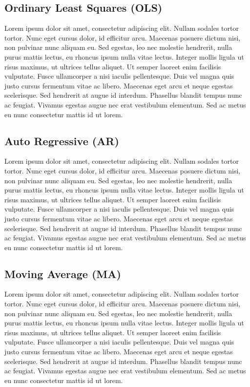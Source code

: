\subsection{Ordinary Least Squares (OLS)}
Lorem ipsum dolor sit amet, consectetur adipiscing elit. Nullam sodales tortor tortor. Nunc eget cursus dolor, id efficitur arcu. Maecenas posuere dictum nisi, non pulvinar nunc aliquam eu. Sed egestas, leo nec molestie hendrerit, nulla purus mattis lectus, eu rhoncus ipsum nulla vitae lectus. Integer mollis ligula ut risus maximus, ut ultrices tellus aliquet. Ut semper laoreet enim facilisis vulputate. Fusce ullamcorper a nisi iaculis pellentesque. Duis vel magna quis justo cursus fermentum vitae ac libero. Maecenas eget arcu et neque egestas scelerisque. Sed hendrerit at augue id interdum. Phasellus blandit tempus nunc ac feugiat. Vivamus egestas augue nec erat vestibulum elementum. Sed ac metus eu nunc consectetur mattis id ut lorem.

\subsection{Auto Regressive (AR)}
Lorem ipsum dolor sit amet, consectetur adipiscing elit. Nullam sodales tortor tortor. Nunc eget cursus dolor, id efficitur arcu. Maecenas posuere dictum nisi, non pulvinar nunc aliquam eu. Sed egestas, leo nec molestie hendrerit, nulla purus mattis lectus, eu rhoncus ipsum nulla vitae lectus. Integer mollis ligula ut risus maximus, ut ultrices tellus aliquet. Ut semper laoreet enim facilisis vulputate. Fusce ullamcorper a nisi iaculis pellentesque. Duis vel magna quis justo cursus fermentum vitae ac libero. Maecenas eget arcu et neque egestas scelerisque. Sed hendrerit at augue id interdum. Phasellus blandit tempus nunc ac feugiat. Vivamus egestas augue nec erat vestibulum elementum. Sed ac metus eu nunc consectetur mattis id ut lorem.

\subsection{Moving Average (MA)}
Lorem ipsum dolor sit amet, consectetur adipiscing elit. Nullam sodales tortor tortor. Nunc eget cursus dolor, id efficitur arcu. Maecenas posuere dictum nisi, non pulvinar nunc aliquam eu. Sed egestas, leo nec molestie hendrerit, nulla purus mattis lectus, eu rhoncus ipsum nulla vitae lectus. Integer mollis ligula ut risus maximus, ut ultrices tellus aliquet. Ut semper laoreet enim facilisis vulputate. Fusce ullamcorper a nisi iaculis pellentesque. Duis vel magna quis justo cursus fermentum vitae ac libero. Maecenas eget arcu et neque egestas scelerisque. Sed hendrerit at augue id interdum. Phasellus blandit tempus nunc ac feugiat. Vivamus egestas augue nec erat vestibulum elementum. Sed ac metus eu nunc consectetur mattis id ut lorem.

